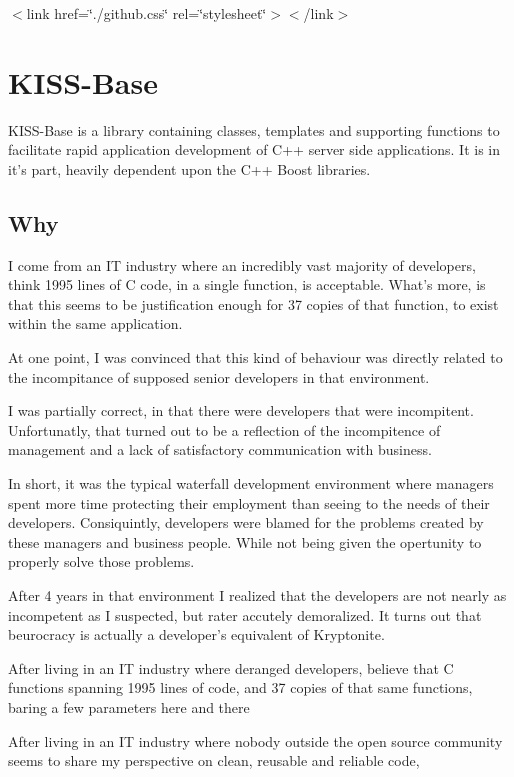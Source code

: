 $<$link href=\char`\"{}./github.\-css\char`\"{} rel=\char`\"{}stylesheet\char`\"{}$>$$<$/link$>$

\section*{K\-I\-S\-S-\/\-Base}

K\-I\-S\-S-\/\-Base is a library containing classes, templates and supporting functions to facilitate rapid application development of C++ server side applications. It is in it's part, heavily dependent upon the C++ Boost libraries.

\subsection*{Why}

I come from an I\-T industry where an incredibly vast majority of developers, think 1995 lines of C code, in a single function, is acceptable. What's more, is that this seems to be justification enough for 37 copies of that function, to exist within the same application.

At one point, I was convinced that this kind of behaviour was directly related to the incompitance of supposed senior developers in that environment.

I was partially correct, in that there were developers that were incompitent. Unfortunatly, that turned out to be a reflection of the incompitence of management and a lack of satisfactory communication with business.

In short, it was the typical waterfall development environment where managers spent more time protecting their employment than seeing to the needs of their developers. Consiquintly, developers were blamed for the problems created by these managers and business people. While not being given the opertunity to properly solve those problems.

After 4 years in that environment I realized that the developers are not nearly as incompetent as I suspected, but rater accutely demoralized. It turns out that beurocracy is actually a developer's equivalent of Kryptonite.

After living in an I\-T industry where deranged developers, believe that C functions spanning 1995 lines of code, and 37 copies of that same functions, baring a few parameters here and there

After living in an I\-T industry where nobody outside the open source community seems to share my perspective on clean, reusable and reliable code,

